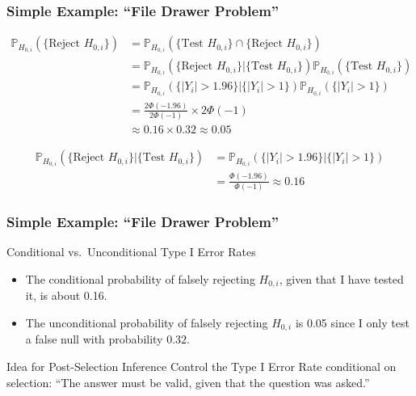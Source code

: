 \begin{frame}
  \frametitle{Simple Example: ``File Drawer Problem''}

  \small

  \begin{align*}
    \mathbb{P}_{H_{0,i}}(\{\mbox{Reject } H_{0,i}\}) &= \mathbb{P}_{H_{0,i}}(\{\mbox{Test } H_{0,i} \}\cap \{ \mbox{Reject } H_{0,i} \})\\
    &= \mathbb{P}_{H_{0,i}}(\{\mbox{Reject } H_{0,i}\} |\{\mbox{Test } H_{0,i}\})\mathbb{P}_{H_{0,i}}(\{\mbox{Test } H_{0,i}\})\\
    &= \mathbb{P}_{H_{0,i}}\left(\{|Y_i| > 1.96\}|\{|Y_i|>1\} \right) \mathbb{P}_{H_{0,i}}(\{|Y_i|>1\})\\
    &= \frac{2 \Phi(-1.96)}{2 \Phi(-1)} \times 2 \Phi(-1)\\
    &\approx 0.16 \times 0.32 \approx 0.05
  \end{align*}

  \vspace{-1em}

  \begin{align*}
  \mathbb{P}_{H_{0,i}}(\{\mbox{Reject } H_{0,i}\} |\{\mbox{Test } H_{0,i}\}) &= \mathbb{P}_{H_{0,i}}\left(\{|Y_i| > 1.96\}|\{|Y_i|>1\} \right)\\
  &= \frac{\Phi(-1.96)}{\Phi(-1)} \approx 0.16
  \end{align*}

\end{frame}
\begin{frame}
  \frametitle{Simple Example: ``File Drawer Problem''}

  \begin{block}{Conditional vs.\ Unconditional Type I Error Rates}
  \begin{itemize}
    \item The \alert{conditional} probability of falsely rejecting $H_{0,i}$, given that I have tested it, is about 0.16.
    \item The \alert{unconditional} probability of falsely rejecting $H_{0,i}$ is 0.05 since I only test a false null with probability $0.32$.
  \end{itemize}
\end{block}

\begin{block}{Idea for Post-Selection Inference}
  Control the Type I Error Rate \alert{conditional on selection}: ``The answer must be valid, given that the question was asked.''
\end{block}


\end{frame}
